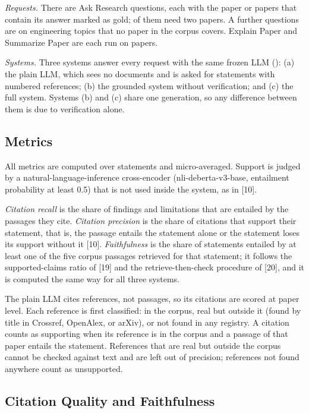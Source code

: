 \documentclass[10pt,twocolumn,letterpaper]{article}
\begin{document}
\emph{Requests.} There are \ResNAsk{} Ask Research questions, each with the paper or papers that contain its answer marked as gold; \ResNCross{} of them need two papers. A further \ResNUnans{} questions are on engineering topics that no paper in the corpus covers. Explain Paper and Summarize Paper are each run on \ResNPaperTasks{} papers.

\emph{Systems.} Three systems answer every request with the same frozen LLM (\ResLLM): (a) the plain LLM, which sees no documents and is asked for statements with numbered references; (b) the grounded system without verification; and (c) the full system. Systems (b) and (c) share one generation, so any difference between them is due to verification alone.

\subsection{Metrics}
All metrics are computed over statements and micro-averaged. Support is judged by a natural-language-inference cross-encoder (nli-deberta-v3-base, entailment probability at least 0.5) that is not used inside the system, as in [10].

\emph{Citation recall} is the share of findings and limitations that are entailed by the passages they cite. \emph{Citation precision} is the share of citations that support their statement, that is, the passage entails the statement alone or the statement loses its support without it [10]. \emph{Faithfulness} is the share of statements entailed by at least one of the five corpus passages retrieved for that statement; it follows the supported-claims ratio of [19] and the retrieve-then-check procedure of [20], and it is computed the same way for all three systems.

The plain LLM cites references, not passages, so its citations are scored at paper level. Each reference is first classified: in the corpus, real but outside it (found by title in Crossref, OpenAlex, or arXiv), or not found in any registry. A citation counts as supporting when its reference is in the corpus and a passage of that paper entails the statement. References that are real but outside the corpus cannot be checked against text and are left out of precision; references not found anywhere count as unsupported.

\subsection{Citation Quality and Faithfulness}
\begin{table}[t]
\caption{Main Comparison (percent, except the last three columns)}
\label{tab:main}
\footnotesize\setlength{\tabcolsep}{3pt}
\resizebox{\columnwidth}{!}{\ResTableMain}
\end{table}
\end{document}
